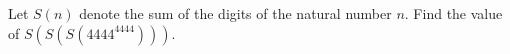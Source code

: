 Let $S(n)$ denote the sum of the digits of the natural number $n$. Find the value of $S(S(S(4444^{4444})))$.
